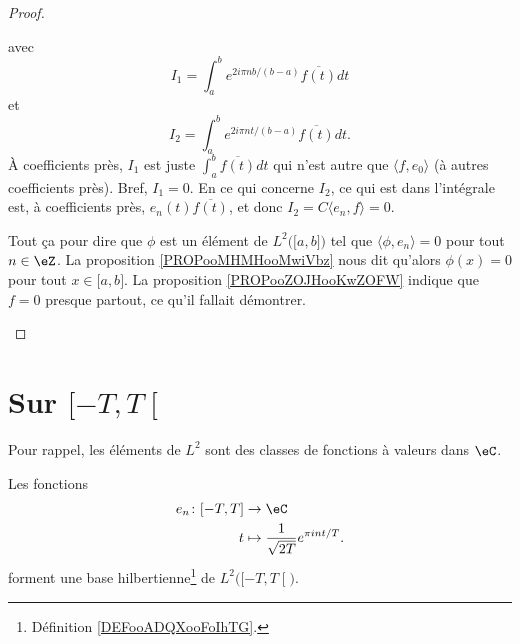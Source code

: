 \begin{proof}
\begin{subproof}
\begin{equation}
		\end{equation}
		avec
		\begin{equation}
			I_1=\int_a^be^{2i\pi nb/(b-a)}\overline{f(t)}dt
		\end{equation}
		et
		\begin{equation}
			I_2=\int_a^be^{2i\pi nt/(b-a)}\overline{f(t)}dt.
		\end{equation}
		À coefficients près, \( I_1\) est juste \( \int_a^b\overline{f(t)}dt\) qui n'est autre que \( \langle f, e_0 \rangle\) (à autres coefficients près).  Bref, \( I_1=0\). En ce qui concerne \( I_2\), ce qui est dans l'intégrale est, à coefficients près, \( e_n(t)\overline{f(t)}\), et donc \( I_2=C\langle e_n, f \rangle=0\).

		Tout ça pour dire que \( \phi\) est un élément de \( L^2\big( \mathopen[ a,b\mathclose] \big)\) tel que \( \langle \phi, e_n \rangle=0\) pour tout \( n\in \eZ\). La proposition \ref{PROPooMHMHooMwiVbz} nous dit qu'alors \( \phi(x)=0\) pour tout \( x\in \mathopen[ a,b\mathclose]\). La proposition \ref{PROPooZOJHooKwZOFW} indique que \( f=0\) presque partout, ce qu'il fallait démontrer.
	\end{subproof}
\end{proof}



\section{Sur \( \mathopen\lbrack -T , T \mathclose\lbrack\)}

Pour rappel, les éléments de \( L^2\) sont des classes de fonctions à valeurs dans \( \eC\).

\begin{proposition}     \label{PROPooHNJZooGfRCfU}
	Les fonctions
	\begin{equation}
		\begin{aligned}
			e_n\colon \mathopen[ -T , T \mathclose] & \to \eC                                        \\
			t                                       & \mapsto \frac{1}{ \sqrt{ 2T } } e^{\pi int/T}.
		\end{aligned}
	\end{equation}
	forment une base hilbertienne\footnote{Définition \ref{DEFooADQXooFoIhTG}.} de \( L^2\big( \mathopen[ -T , T \mathclose[ \big)\).
\end{proposition}

